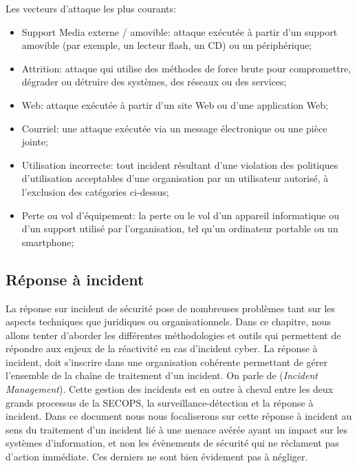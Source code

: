 Les vecteurs d'attaque les plus courants:

\begin{itemize}
  \item Support Media externe / amovible: attaque exécutée à partir d'un support amovible (par exemple, un lecteur flash, un CD) ou un périphérique;
  \item Attrition: attaque qui utilise des méthodes de force brute pour compromettre, dégrader ou détruire des systèmes, des réseaux ou des services;
  \item Web: attaque exécutée à partir d'un site Web ou d'une application Web;
  \item Courriel: une attaque exécutée via un message électronique ou une pièce jointe;
  \item Utilisation incorrecte: tout incident résultant d'une violation des politiques d'utilisation acceptables d'une organisation par un utilisateur autorisé, à l'exclusion des catégories ci-dessus;
  \item  Perte ou vol d'équipement: la perte ou le vol d'un appareil informatique ou d'un support utilisé par l'organisation, tel qu'un ordinateur portable ou un smartphone;
\end{itemize}


\subsection{Réponse à incident}

La réponse sur incident de sécurité pose de nombreuses problèmes  tant sur les aspects techniques que juridiques ou organisationnels. Dans ce chapitre, nous allons tenter d'aborder les différentes méthodologies et outils qui permettent de répondre aux enjeux de la réactivité en cas d'incident cyber. La réponse à incident, doit s'inscrire dans une organisation cohérente permettant de gérer l'ensemble de la chaîne de traitement d'un incident. On parle de  (\textit{Incident Management}). Cette gestion des incidents est en outre à cheval entre les deux grands processus  de la SECOPS, la surveillance-détection et la  réponse à incident. Dans ce document nous nous focaliserons sur cette réponse à incident au sens du traitement d'un incident lié à une menace avérée ayant un impact sur les systèmes d'information, et non les évènements de sécurité qui ne réclament pas d'action immédiate. Ces derniers ne sont bien évidement pas à négliger.

